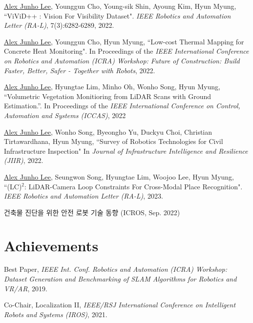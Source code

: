 \documentclass[margin]{res}
\begin{document}
\begin{resume}
		\par\underline{Alex Junho Lee}, Younggun Cho, Young-sik Shin, Ayoung Kim, Hyun Myung, ``ViViD++ : Vision For Visibility Dataset". \textit{IEEE Robotics and Automation Letter (RA-L)}, 7(3):6282-6289, 2022.
		
		\par\underline{Alex Junho Lee}, Younggun Cho, Hyun Myung, ``Low-cost Thermal Mapping for Concrete Heat Monitoring". In Proceedings of the \textit{IEEE International Conference on Robotics and Automation (ICRA) Workshop: Future of Construction: Build Faster, Better, Safer - Together with Robots}, 2022.
		
		\par\underline{Alex Junho Lee}, Hyungtae Lim, Minho Oh, Wonho Song, Hyun Myung, ``Volumetric Vegetation Monitioring from LiDAR Scans with Ground Estimation.''. In Proceedings of the \textit{IEEE International Conference on Control, Automation and Systems (ICCAS)}, 2022
		
		\par\underline{Alex Junho Lee}, Wonho Song, Byeongho Yu, Duckyu Choi, Christian Tirtawardhana, Hyun Myung, ``Survey of Robotics Technologies for Civil Infrastructure Inspection" In \textit{Journal of Infrastructure Intelligence and Resilience (JIIR)}, 2022.
		
		\par\underline{Alex Junho Lee}, Seungwon Song, Hyungtae Lim, Woojoo Lee, Hyun Myung, ``(LC)$^2$: LiDAR-Camera Loop Constraints
		For Cross-Modal Place Recognition". \textit{IEEE Robotics and Automation Letter (RA-L)}, 2023.
		
		\par 건축물 진단을 위한 안전 로봇 기술 동향 (ICROS, Sep. 2022)
		
		\newpage
		\section{Achievements}
		
		\par Best Paper,\textit{ IEEE Int. Conf. Robotics and Automation (ICRA) Workshop: Dataset Generation and Benchmarking of SLAM Algorithms for Robotics and VR/AR}, 2019.
						
		\par Co-Chair, Localization II, \textit{IEEE/RSJ International Conference on Intelligent Robots and Systems (IROS)}, 2021.
		

\end{resume}
\end{document}
